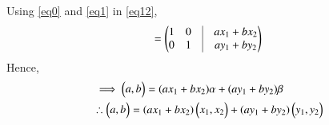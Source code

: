 \documentclass[journal,12pt,twocolumn]{IEEEtran}
\begin{document}
Using \ref{eq0} and \ref{eq1} in \ref{eq12},
\begin{align}
=\myvec{1&0&\vrule&ax_1+bx_2\\0&1&\vrule&ay_1+by_2}
\end{align}
Hence,
\begin{align}
&\implies \begin{pmatrix}a,b\end{pmatrix}=(ax_1+bx_2)\mathbf{\alpha}+(ay_1+by_2)\mathbf{\beta}\\
&\therefore \begin{pmatrix}a,b\end{pmatrix}=(ax_1+bx_2)\begin{pmatrix}x_1,x_2\end{pmatrix}+(ay_1+by_2)\begin{pmatrix}y_1,y_2\end{pmatrix}
\end{align}
\end{document}
